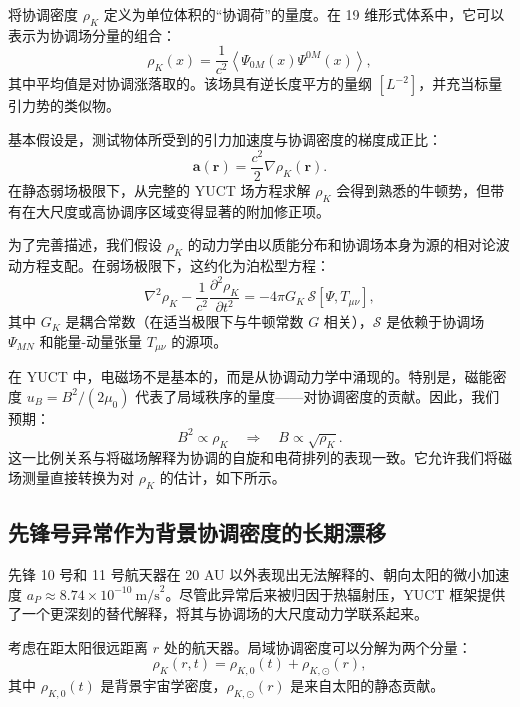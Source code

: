 \documentclass[11pt,a4paper]{article}
\theoremstyle{remark}
\begin{document}
	将协调密度 \(\rho_K\) 定义为单位体积的“协调荷”的量度。在 19 维形式体系中，它可以表示为协调场分量的组合：
	\begin{equation}
		\rho_K(x) = \frac{1}{c^2} \left\langle \Psi_{0M}(x) \Psi^{0M}(x) \right\rangle,
		\label{eq:coord:rho_K_def}
	\end{equation}
	其中平均值是对协调涨落取的。该场具有逆长度平方的量纲 \([L^{-2}]\)，并充当标量引力势的类似物。
	
	基本假设是，测试物体所受到的引力加速度与协调密度的梯度成正比：
	\begin{equation}
		\mathbf{a}(\mathbf{r}) = \frac{c^2}{2} \nabla \rho_K(\mathbf{r}).
		\label{eq:coord:grav_from_rho}
	\end{equation}
	在静态弱场极限下，从完整的 YUCT 场方程求解 \(\rho_K\) 会得到熟悉的牛顿势，但带有在大尺度或高协调序区域变得显著的附加修正项。
	
	为了完善描述，我们假设 \(\rho_K\) 的动力学由以质能分布和协调场本身为源的相对论波动方程支配。在弱场极限下，这约化为泊松型方程：
	\begin{equation}
		\nabla^2 \rho_K - \frac{1}{c^2}\frac{\partial^2 \rho_K}{\partial t^2} = -4\pi G_K \, \mathcal{S}[\Psi, T_{\mu\nu}],
		\label{eq:coord:rho_K_eqn}
	\end{equation}
	其中 \(G_K\) 是耦合常数（在适当极限下与牛顿常数 \(G\) 相关），\(\mathcal{S}\) 是依赖于协调场 \(\Psi_{MN}\) 和能量-动量张量 \(T_{\mu\nu}\) 的源项。
	
	在 YUCT 中，电磁场不是基本的，而是从协调动力学中涌现的。特别是，磁能密度 \(u_B = B^2/(2\mu_0)\) 代表了局域秩序的量度——对协调密度的贡献。因此，我们预期：
	\begin{equation}
		B^2 \propto \rho_K \quad \Longrightarrow \quad B \propto \sqrt{\rho_K}.
		\label{eq:coord:B_rho}
	\end{equation}
	这一比例关系与将磁场解释为协调的自旋和电荷排列的表现一致。它允许我们将磁场测量直接转换为对 \(\rho_K\) 的估计，如下所示。
	
	\subsection{先锋号异常作为背景协调密度的长期漂移}
	\label{subsec:coord:pioneer}
	
	先锋 10 号和 11 号航天器在 20 AU 以外表现出无法解释的、朝向太阳的微小加速度 \(a_P \approx 8.74 \times 10^{-10}\ \text{m/s}^2\)。尽管此异常后来被归因于热辐射压，YUCT 框架提供了一个更深刻的替代解释，将其与协调场的大尺度动力学联系起来。
	
	考虑在距太阳很远距离 \(r\) 处的航天器。局域协调密度可以分解为两个分量：
	\begin{equation}
		\rho_K(r,t) = \rho_{K,0}(t) + \rho_{K,\odot}(r),
		\label{eq:coord:rho_decomp}
	\end{equation}
	其中 \(\rho_{K,0}(t)\) 是背景宇宙学密度，\(\rho_{K,\odot}(r)\) 是来自太阳的静态贡献。
	
\end{document}
